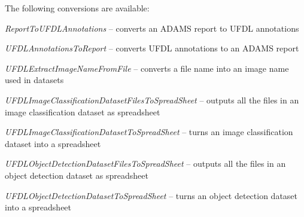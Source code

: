 \documentclass[a4paper]{book}
\begin{document}
The following conversions are available:
\begin{tight_itemize}
  \item \textit{ReportToUFDLAnnotations} -- converts an ADAMS report to UFDL annotations
  \item \textit{UFDLAnnotationsToReport} -- converts UFDL annotations to an ADAMS report
  \item \textit{UFDLExtractImageNameFromFile} -- converts a file name into an image name used in datasets
  \item \textit{UFDLImageClassificationDatasetFilesToSpreadSheet} -- outputs all the files in an image classification dataset as spreadsheet
  \item \textit{UFDLImageClassificationDatasetToSpreadSheet} -- turns an image classification dataset into a spreadsheet
  \item \textit{UFDLObjectDetectionDatasetFilesToSpreadSheet} -- outputs all the files in an object detection dataset as spreadsheet
  \item \textit{UFDLObjectDetectionDatasetToSpreadSheet} -- turns an object detection dataset into a spreadsheet
\end{tight_itemize}
\end{document}
